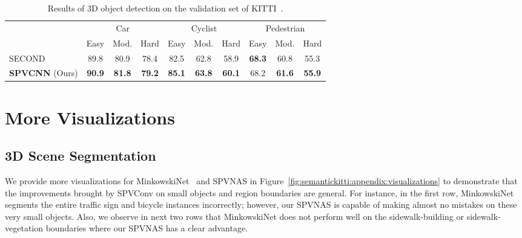\documentclass[runningheads]{llncs}
\newcommand{\fig}[1]{Figure~\ref{#1}}
\def\moduleshort{SPVConv\xspace}
\def\cnnshort{SPVCNN\xspace}
\def\modelshort{SPVNAS\xspace}
\begin{document}
\begin{table}[t]
\setlength{\tabcolsep}{4.5pt}
\small\centering
\begin{tabular}{lccccccccc}
    \toprule
     & \multicolumn{3}{c}{Car} & \multicolumn{3}{c}{Cyclist} & \multicolumn{3}{c}{Pedestrian} \\
     \cmidrule(lr){2-4}\cmidrule(lr){5-7}\cmidrule(lr){8-10}
     & Easy & Mod. & Hard & Easy & Mod. & Hard & Easy & Mod. & Hard \\
    \midrule
    SECOND~\cite{yan2018second} & 89.8 & 80.9 & 78.4 & 82.5 & 62.8 & 58.9 & \textbf{68.3} & 60.8 & 55.3 \\
    \midrule
    \textbf{\cnnshort} (Ours) & \textbf{90.9} & \textbf{81.8} & \textbf{79.2} & \textbf{85.1} & \textbf{63.8} & \textbf{60.1} & 68.2 & \textbf{61.6} & \textbf{55.9} \\
    \bottomrule
\end{tabular}
\caption{Results of 3D object detection on the validation set of KITTI~\cite{geiger2013vision}.}
\label{tab:kitti:results_val}
\end{table} 
\section{More Visualizations}

\subsection{3D Scene Segmentation}

We provide more visualizations for MinkowskiNet~\cite{choy20194d} and \modelshort in \fig{fig:semantickitti:appendix:visualizations} to demonstrate that the improvements brought by \moduleshort on small objects and region boundaries are general. For instance, in the first row, MinkowskiNet segments the entire traffic sign and bicycle instances incorrectly; however, our \modelshort is capable of making almost no mistakes on these very small objects. Also, we observe in next two rows that MinkowskiNet does not perform well on the sidewalk-building or sidewalk-vegetation boundaries where our \modelshort has a clear advantage.
\end{document}
